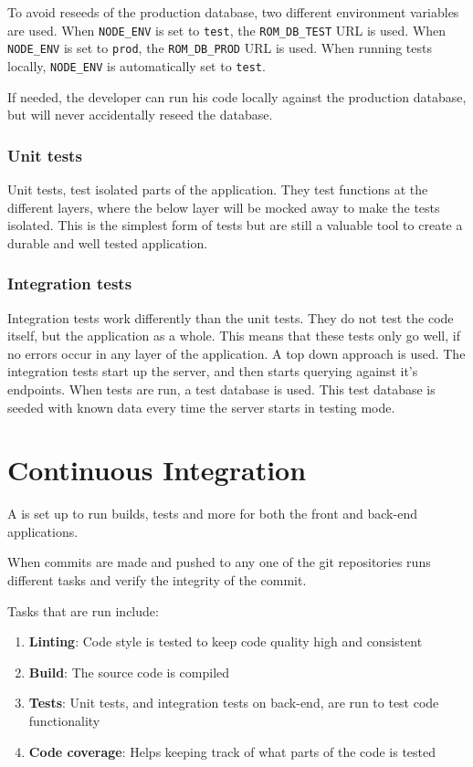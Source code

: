 To avoid reseeds of the production database, two different environment variables are used.
When \verb+NODE_ENV+ is set to \verb+test+, the \verb+ROM_DB_TEST+ URL is used. 
When \verb+NODE_ENV+ is set to \verb+prod+, the \verb+ROM_DB_PROD+ URL is used. 
When running tests locally, \verb+NODE_ENV+ is automatically set to \verb+test+.

If needed, the developer can run his code locally against the production database, but will never accidentally reseed the database.

\subsubsection{Unit tests}
Unit tests, test isolated parts of the application. 
They test functions at the different layers, where the below layer will be mocked away to make the tests isolated.
This is the simplest form of tests but are still a valuable tool to create a durable and well tested application.

\subsubsection{Integration tests}
Integration tests work differently than the unit tests. 
They do not test the code itself, but the application as a whole. 
This means that these tests only go well, if no errors occur in any layer of the application. 
A top down approach is used.
The integration tests start up the  server, and then starts querying against it's endpoints. 
When tests are run, a test database is used. This test database is seeded with known data every time the server starts in testing mode.

\section{Continuous Integration}
A  is set up to run builds, tests and more for both the front and back-end applications.

When commits are made and pushed to any one of the git repositories  runs different tasks and verify the integrity of the commit.

Tasks that are run include:

\begin{enumerate}
\item \textbf{Linting}: Code style is tested to keep code quality high and consistent
\item \textbf{Build}: The source code is compiled
\item \textbf{Tests}: Unit tests, and integration tests on back-end, are run to test code functionality
\item \textbf{Code coverage}: Helps keeping track of what parts of the code is tested
\end{enumerate} 

